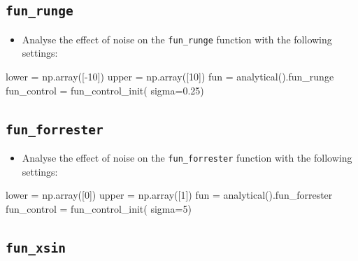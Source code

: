 \documentclass[
  letterpaper,
  DIV=11,
  numbers=noendperiod]{scrreprt}
\newenvironment{Shaded}{\begin{snugshade}}{\end{snugshade}}
\newcommand{\DecValTok}[1]{\textcolor[rgb]{0.68,0.00,0.00}{#1}}
\newcommand{\FloatTok}[1]{\textcolor[rgb]{0.68,0.00,0.00}{#1}}
\newcommand{\NormalTok}[1]{\textcolor[rgb]{0.00,0.23,0.31}{#1}}
\newcommand{\OperatorTok}[1]{\textcolor[rgb]{0.37,0.37,0.37}{#1}}
\providecommand{\tightlist}{%
  \setlength{\itemsep}{0pt}\setlength{\parskip}{0pt}}\usepackage{longtable,booktabs,array}
\begin{document}
\subsection{\texorpdfstring{\texttt{fun\_runge}}{fun\_runge}}\label{fun_runge}

\begin{itemize}
\tightlist
\item
  Analyse the effect of noise on the \texttt{fun\_runge} function with
  the following settings:
\end{itemize}

\begin{Shaded}
\begin{Highlighting}[]
\NormalTok{lower }\OperatorTok{=}\NormalTok{ np.array([}\OperatorTok{{-}}\DecValTok{10}\NormalTok{])}
\NormalTok{upper }\OperatorTok{=}\NormalTok{ np.array([}\DecValTok{10}\NormalTok{])}
\NormalTok{fun }\OperatorTok{=}\NormalTok{ analytical().fun\_runge}
\NormalTok{fun\_control }\OperatorTok{=}\NormalTok{ fun\_control\_init(}
\NormalTok{    sigma}\OperatorTok{=}\FloatTok{0.25}\NormalTok{)}
\end{Highlighting}
\end{Shaded}

\subsection{\texorpdfstring{\texttt{fun\_forrester}}{fun\_forrester}}\label{fun_forrester}

\begin{itemize}
\tightlist
\item
  Analyse the effect of noise on the \texttt{fun\_forrester} function
  with the following settings:
\end{itemize}

\begin{Shaded}
\begin{Highlighting}[]
\NormalTok{lower }\OperatorTok{=}\NormalTok{ np.array([}\DecValTok{0}\NormalTok{])}
\NormalTok{upper }\OperatorTok{=}\NormalTok{ np.array([}\DecValTok{1}\NormalTok{])}
\NormalTok{fun }\OperatorTok{=}\NormalTok{ analytical().fun\_forrester}
\NormalTok{fun\_control }\OperatorTok{=}\NormalTok{ fun\_control\_init(}
\NormalTok{    sigma}\OperatorTok{=}\DecValTok{5}\NormalTok{)}
\end{Highlighting}
\end{Shaded}

\subsection{\texorpdfstring{\texttt{fun\_xsin}}{fun\_xsin}}\label{fun_xsin}
\end{document}
